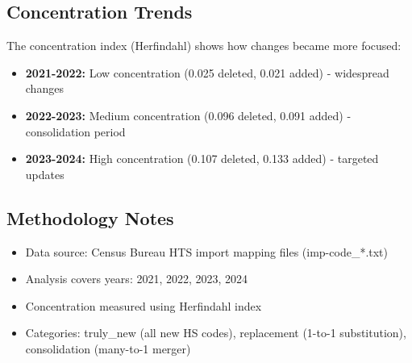 \documentclass[11pt]{article}
\begin{document}
\subsection{Concentration Trends}

The concentration index (Herfindahl) shows how changes became more focused:
\begin{itemize}
    \item \textbf{2021-2022:} Low concentration (0.025 deleted, 0.021 added) - widespread changes
    \item \textbf{2022-2023:} Medium concentration (0.096 deleted, 0.091 added) - consolidation period  
    \item \textbf{2023-2024:} High concentration (0.107 deleted, 0.133 added) - targeted updates
\end{itemize}

\subsection{Methodology Notes}

\begin{itemize}
    \item Data source: Census Bureau HTS import mapping files (imp-code\_*.txt)
    \item Analysis covers years: 2021, 2022, 2023, 2024
    \item Concentration measured using Herfindahl index
    \item Categories: truly\_new (all new HS codes), replacement (1-to-1 substitution), consolidation (many-to-1 merger)
\end{itemize}
\end{document}

